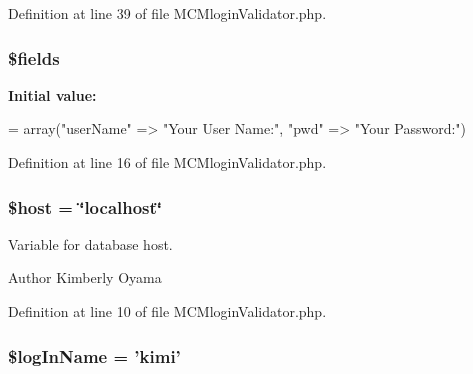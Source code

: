 Definition at line 39 of file M\-C\-Mlogin\-Validator.\-php.

\hypertarget{_m_c_mlogin_validator_8php_ab2303c817e3b402b77b7f99627b9c319}{
\subsubsection[{\$fields}]{\setlength{\rightskip}{0pt plus 5cm}\$fields}}\label{_m_c_mlogin_validator_8php_ab2303c817e3b402b77b7f99627b9c319}
{\bfseries Initial value\-:}
\begin{DoxyCode}
= array(\textcolor{stringliteral}{"userName"} => \textcolor{stringliteral}{"Your User Name:"},
                    \textcolor{stringliteral}{"pwd"} => \textcolor{stringliteral}{"Your Password:"})
\end{DoxyCode}


Definition at line 16 of file M\-C\-Mlogin\-Validator.\-php.

\hypertarget{_m_c_mlogin_validator_8php_a711797613cb863ca0756df789c396bf2}{
\subsubsection[{\$host}]{\setlength{\rightskip}{0pt plus 5cm}\$host = \char`\"{}localhost\char`\"{}}}\label{_m_c_mlogin_validator_8php_a711797613cb863ca0756df789c396bf2}
Variable for database host.

\begin{DoxyAuthor}{Author}
Kimberly Oyama 
\end{DoxyAuthor}


Definition at line 10 of file M\-C\-Mlogin\-Validator.\-php.

\hypertarget{_m_c_mlogin_validator_8php_a30b110afa9d5bd2d01ba8f74a46d2b3f}{
\subsubsection[{\$log\-In\-Name}]{\setlength{\rightskip}{0pt plus 5cm}\$log\-In\-Name = 'kimi'}}\label{_m_c_mlogin_validator_8php_a30b110afa9d5bd2d01ba8f74a46d2b3f}


